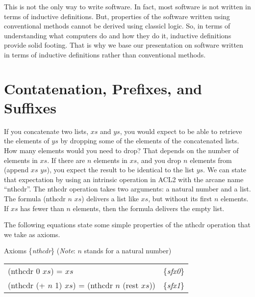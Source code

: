 This is not the only way to write software.
In fact, most software is not written in terms of inductive definitions.
But, properties of the software written using conventional methods cannot be derived using classicl logic.
So, in terms of understanding what computers do and how they do it,
inductive definitions provide solid footing.
That is why we base our presentation on software written
in terms of inductive definitions rather than conventional methods.

\section{Contatenation, Prefixes, and Suffixes}
\label{sec:append-prefix-suffix}

If you concatenate two lists, $xs$ and $ys$, you would expect to be able to retrieve the elements of $ys$ by dropping some of the elements of the concatenated lists. How many elements would you need to drop? That depends on the number of elements in $xs$. If there are $n$ elements in $xs$, and you drop $n$ elements from (append $xs$ $ys$), you expect the result to be identical to the list $ys$. We can state that expectation by using an intrinsic operation in ACL2 with the arcane name ``nthcdr''. The nthcdr operation takes two arguments: a natural number and a list. The formula (nthcdr $n$ $xs$) delivers a list like $xs$, but without its first $n$ elements. If $xs$ has fewer than $n$ elements, then the formula delivers the empty list.

The following equations state some simple properties of the nthcdr operation that we take as axioms.

\begin{samepage}
\label{nthcdr-equations}
\begin{center}
Axioms \{\emph{nthcdr}\} (\emph{Note}: $n$ stands for a natural number) \\
\begin{tabular}{ll}
(nthcdr 0 $xs$) = $xs$                             & \{\emph{sfx0}\}     \\
(nthcdr (+ $n$ 1) $xs$) = (nthcdr $n$ (rest $xs$)) & \{\emph{sfx1}\}     \\
\end{tabular}
\end{center}
\end{samepage}


